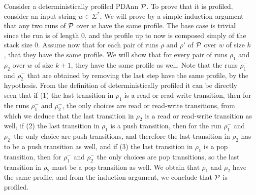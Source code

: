 
Consider a deterministically profiled PDAnn $\mathcal{P}$. To prove that it is profiled, consider an input string $w\in \Sigma^*$. We will prove by a simple induction argument that any two runs of $\mathcal{P}$ over $w$ have the same profile. The base case is trivial since the run is of length 0, and the profile up to now is composed simply of the stack size 0. Assume now that for each pair of runs $\rho$ and $\rho'$ of $\mathcal{P}$ over $w$ of size $k$, that they have the same profile. We will show that for every pair of runs $\rho_1$ and $\rho_2$ over $w$ of size $k+1$, they have the same profile as well. Note that the runs $\rho_1^-$ and $\rho_2^-$ that are obtained by removing the last step have the same profile, by the hypothesis. From the definition of deterministically profiled it can be directly seen that if (1) the last transition in $\rho_1$ is a read or read-write transition, then for the runs $\rho_1^-$ and $\rho_2^-$, the only choices are read or read-write transitions, from which we deduce that the last transition in $\rho_2$ is a read or read-write transition as well, if (2) the last transition in $\rho_1$ is a push transition, then for the run $\rho_1^-$ and $\rho_2^-$ the only choice are push transitions, and therefore the last transition in $\rho_2$ has to be a push transition as well, and if (3) the last transition in $\rho_1$ is a pop transition, then for $\rho_1^-$ and $\rho_2^-$ the only choices are pop transitions, so the last transition in $\rho_2$ must be a pop transition as well. We obtain that $\rho_1$ and $\rho_2$ have the same profile, and from the induction argument, we conclude that $\mathcal{P}$ is profiled.

